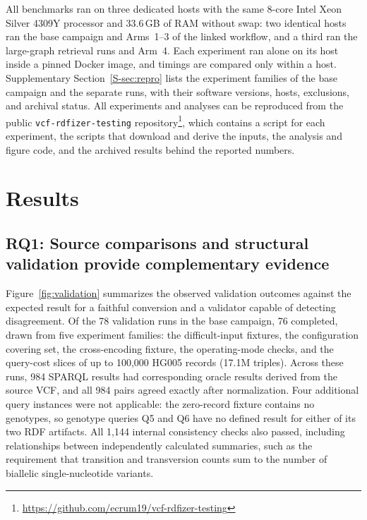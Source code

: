 \documentclass[pdflatex,sn-mathphys-num]{sn-jnl}
\begin{document}
All benchmarks ran on three dedicated hosts with the same 8-core Intel Xeon Silver 4309Y processor and 33.6\,GB of RAM without swap: two identical hosts ran the base campaign and Arms~1--3 of the linked workflow, and a third ran the large-graph retrieval runs and Arm~4.
Each experiment ran alone on its host inside a pinned Docker image, and timings are compared only within a host.
Supplementary Section~\ref{S-sec:repro} lists the experiment families of the base campaign and the separate runs, with their software versions, hosts, exclusions, and archival status.
All experiments and analyses can be reproduced from the public \texttt{vcf-rdfizer-testing} repository\footnote{\url{https://github.com/ecrum19/vcf-rdfizer-testing}}, which contains a script for each experiment, the scripts that download and derive the inputs, the analysis and figure code, and the archived results behind the reported numbers.

\section{Results}\label{sec:results}
\subsection{RQ1: Source comparisons and structural validation provide complementary evidence}\label{subsec:results-fidelity}

Figure~\ref{fig:validation} summarizes the observed validation outcomes against the expected result for a faithful conversion and a validator capable of detecting disagreement.
Of the 78 validation runs in the base campaign, 76 completed, drawn from five experiment families: the difficult-input fixtures, the configuration covering set, the cross-encoding fixture, the operating-mode checks, and the query-cost slices of up to 100,000 HG005 records (17.1M triples).
Across these runs, 984 SPARQL results had corresponding oracle results derived from the source VCF, and all 984 pairs agreed exactly after normalization.
Four additional query instances were not applicable: the zero-record fixture contains no genotypes, so genotype queries Q5 and Q6 have no defined result for either of its two RDF artifacts.
All 1,144 internal consistency checks also passed, including relationships between independently calculated summaries, such as the requirement that transition and transversion counts sum to the number of biallelic single-nucleotide variants.
\end{document}
